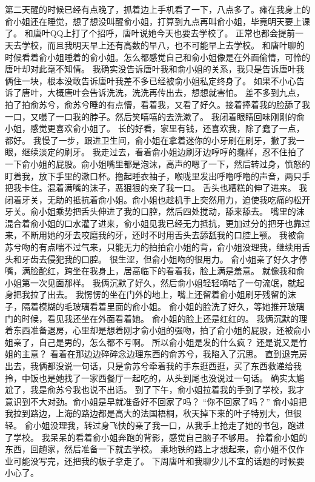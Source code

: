 \chapter{}
第二天醒的时候已经有点晚了，抓着边上手机看了一下，八点多了。瘫在我身上的俞小姐还在睡觉，想了想没叫醒俞小姐，打算到九点再叫俞小姐，毕竟明天要上课了。
和唐叶QQ上打了个招呼，唐叶说她今天也要去学校了。
正常也都会提前一天去学校，而且我明天早上还有高数的早八，也不可能早上去学校。
和唐叶聊的时候看着俞小姐睡着的俞小姐。怎么都感觉自己和俞小姐像是在外面偷情，可怜的唐叶却对此毫不知情。
我确实没告诉唐叶我和俞小姐的关系，我只是告诉唐叶我俩住一块，根本没敢告诉唐叶我差不多已经被俞小姐私定终身了。
如果不小心告诉了唐叶，大概唐叶会告诉洗洗，洗洗再传出去，想想就害怕。
差不多到九点，拍了拍俞苏兮，俞苏兮睡的有点懵，看着我，又看了好久。接着捧着我的脸舔了我一口，又嘬了一口我的脖子。然后笑嘻嘻的去洗漱了。
我闭着眼睛回味刚刚的俞小姐，感觉更喜欢俞小姐了。
长的好看，家里有钱，还喜欢我，除了蠢了一点，都好。
我慢了一步，跟进卫生间，俞小姐在拿着迷你的小牙刷在刷牙，撇了我一眼，继续淡定的刷牙。
我走过去，看着俞小姐边刷牙边哼哼的蠢样，忍不住拍了一下俞小姐的屁股。俞小姐嘴里都是泡沫，高声的嗯了一下，然后转过身，愤怒的盯着我，放下手里的漱口杯。撸起睡衣袖子，喉咙里发出呼噜呼噜的声音，两只手把我卡住。混着满嘴的沫子，恶狠狠的亲了我一口。
舌头也糟糕的伸了进来。
我闭着牙关，无助的抵抗着俞小姐。俞小姐也趁机手上突然用力，迫使我吃痛的松开牙关。俞小姐乘势把舌头伸进了我的口腔，然后四处搅动，舔来舔去。
嘴里的沫混合着俞小姐的口水灌了进来，俞小姐见我已经无力抵抗，更加过分的把牙也靠过来，不断用她的牙去咬磨我的牙，还时不时用舌头去舔舐我的口腔上颚。
我被俞苏兮吻的有点喘不过气来，只能无力的拍拍俞小姐的背，俞小姐没理我，继续用舌头和牙齿去侵犯我的口腔。
很生涩，但俞小姐吻的很用力。
俞小姐亲了好久才停嘴，满脸酡红，跨坐在我身上，居高临下的看着我，脸上满是羞意。
就像我和俞小姐第一次见面那样。
我俩沉默了好久，然后俞小姐轻轻嘀咕了一句流氓，就起身把我拉了出去。
我愣愣的坐在门外的地上，嘴上还留着俞小姐刷牙残留的沫子，隔着模糊的毛玻璃看着里面的俞小姐。
俞小姐的脸洗了好久，等她推开玻璃门的时候，看见我还坐在外面看着她。
俞小姐的脸上还是红红的。
我俩沉默的理着东西准备退房，心里却是想着刚才俞小姐的强吻，拍了俞小姐的屁股，还被俞小姐亲了，自己是男的，怎么都不亏啊。
所以俞小姐是发的什么疯？
还是说又是竹姐的主意？
看着在那边边碎碎念边理东西的俞苏兮，我陷入了沉思。
直到退完房出去，我俩都没说一句话，只是俞苏兮牵着我的手东逛西逛，买了东西救递给我拎，中饭也是她找了一家西餐厅一起吃的，从头到尾也没说过一句话。
确实太尴尬了，我是俞苏兮我也说不出话。
到了下午，俞小姐拉着我的手到了学校，我才意识到不大对劲。俞小姐是早就准备好不回家了吗？
“你不回家了吗？”
俞小姐把我拉到路边，上海的路边都是高大的法国梧桐，秋天掉下来的叶子特别大，但很轻。
俞小姐没理我，转过身飞快的亲了我一口，从我手上抢走了她的书包，跑进了学校。
我呆呆的看着俞小姐奔跑的背影，感觉自己脑子不够用。
拎着俞小姐的东西，回趟家，然后准备一下就去学校。
乘地铁的路上才想起来，俞小姐不仅作业可能没写完，还把我的板子拿走了。
下周唐叶和我聊少儿不宜的话题的时候要小心了。

